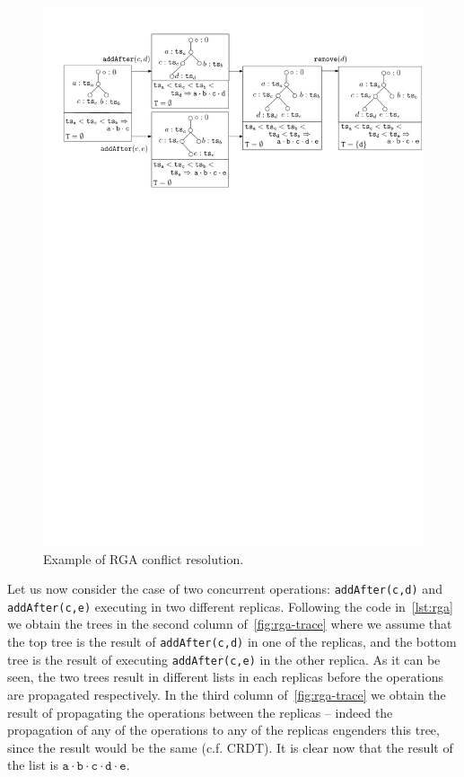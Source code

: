 \begin{figure}[t]
  \centering
  \includegraphics[width=1\textwidth]{figures/RGA-Trace}
  \caption{Example of RGA conflict resolution.}
  \label{fig:rga-trace}
\end{figure}

Let us now consider the case of two concurrent operations:
\lstinline|addAfter(c,d)| and \lstinline|addAfter(c,e)| executing in
two different replicas.
%
Following the code in~\autoref{lst:rga} we obtain the trees in the
second column of~\autoref{fig:rga-trace} where we assume that the
top tree is the result of \lstinline|addAfter(c,d)| in one of the
replicas, and the bottom tree is the result of executing
\lstinline|addAfter(c,e)| in the other replica.
%
As it can be seen, the two trees result in different lists in each
replicas before the operations are propagated respectively. 
%
In the third column of~\autoref{fig:rga-trace} we obtain the
result of propagating the operations between the replicas -- indeed
the propagation of any of the operations to any of the replicas
engenders this tree, since the result would be the same (c.f. CRDT).
%
It is clear now that the result of the list is $\mathtt{a \cdot b
  \cdot c \cdot d \cdot e}$. 


